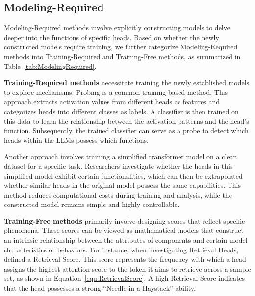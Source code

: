 \documentclass[12pt,letterpaper]{article}
\begin{document}
\subsection*{Modeling-Required} \label{subsec:ModelRequired}

Modeling-Required methods involve explicitly constructing models to delve deeper into the functions of specific heads. Based on whether the newly constructed models require training, we further categorize Modeling-Required methods into Training-Required and Training-Free methods, as summarized in Table~\ref{tab:ModelingRequired}.

\textbf{Training-Required methods} necessitate training the newly established models to explore mechanisms.
Probing is a common training-based method. This approach extracts activation values from different heads as features and categorizes heads into different classes as labels. A classifier is then trained on this data to learn the relationship between the activation patterns and the head's function. Subsequently, the trained classifier can serve as a probe to detect which heads within the LLMs possess which functions.\citep{SemanticConsistency_24_ACL_TJU, ITI_23_NIPS_harvard}

Another approach involves training a simplified transformer model on a clean dataset for a specific task. Researchers investigate whether the heads in this simplified model exhibit certain functionalities, which can then be extrapolated whether similar heads in the original model possess the same capabilities. This method reduces computational costs during training and analysis, while the constructed model remains simple and highly controllable.\citep{IterationHead_24_arXiv_Meta}

\textbf{Training-Free methods} primarily involve designing scores that reflect specific phenomena. These scores can be viewed as mathematical models that construct an intrinsic relationship between the attributes of components and certain model characteristics or behaviors.
For instance, when investigating Retrieval Heads, \citet{RetrievalHead_24_arXiv_PKU} defined a Retrieval Score. This score represents the frequency with which a head assigns the highest attention score to the token it aims to retrieve across a sample set, as shown in Equation~\ref{equ:RetrievalScore}. A high Retrieval Score indicates that the head possesses a strong ``Needle in a Haystack'' ability.
\end{document}
